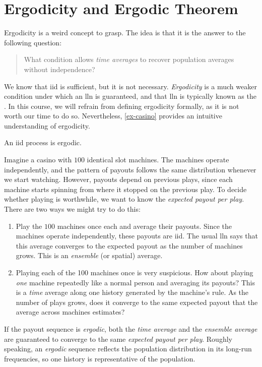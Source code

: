 \documentclass[a4paper,12pt]{article}
\begin{document}
\section{Ergodicity and Ergodic Theorem}\label{sec-ergodicity}

\begin{remark}
	Ergodicity is a weird concept to grasp.
	The idea is that it is the answer to the following question:
	\begin{quote}
		What condition allows \emph{time averages} to recover population averages without independence?
	\end{quote}
	We know that \gls{iid} is sufficient, but it is not necessary.
	\emph{Ergodicity} is a much weaker condition under which an \gls{lln} is guaranteed,
	and that \gls{lln} is typically known as the \emph{}.
	In this course, we will refrain from defining ergodicity formally,
	as it is not worth our time to do so.
	Nevertheless, \autoref{ex-casino} provides an intuitive understanding of ergodicity.
\end{remark}

\begin{remark}
	An \gls{iid} process is ergodic.
\end{remark}

\begin{example}\label{ex-casino}
	Imagine a casino with $100$ identical slot machines.
	The machines operate independently,
	and the pattern of payouts follows the same distribution whenever we start watching.
	However, payouts depend on previous plays,
	since each machine starts spinning from where it stopped on the previous play.
	To decide whether playing is worthwhile,
	we want to know the \emph{expected payout per play}.
	There are two ways we might try to do this:
	\begin{enumerate}
		\item
			Play the $100$ machines once each and average their payouts.
			Since the machines operate independently, these payouts are \gls{iid}.
			The usual \gls{lln} says that this average converges to the expected payout as the number of machines grows.
			This is an \emph{ensemble} (or spatial) average.
		\item
			Playing each of the 100 machines once is very suspicious.
			How about playing \emph{one} machine repeatedly like a normal person and averaging its payouts?
			This is a \emph{time} average along one history generated by the machine's rule.
			As the number of plays grows, does it converge to the same expected payout
			that the average across machines estimates?
	\end{enumerate}
	If the payout sequence is \emph{ergodic},
	both the \emph{time average} and the \emph{ensemble average} are guaranteed to converge to the same \emph{expected payout per play}.
	Roughly speaking,
	an \emph{ergodic} sequence reflects the population distribution in its long-run frequencies,
	so one history is representative of the population.
\end{example}
\end{document}
